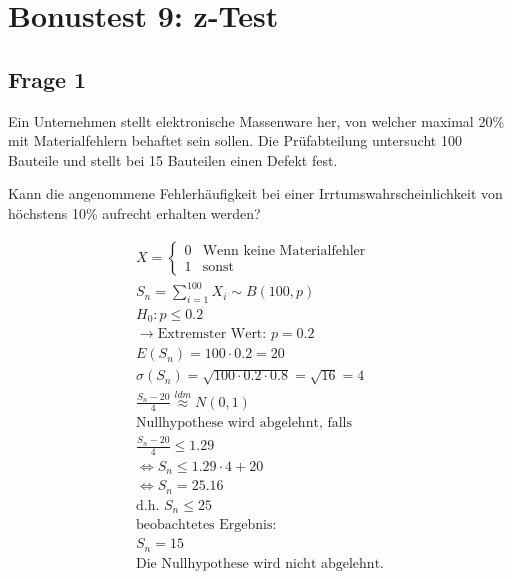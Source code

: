 \chapter{Bonustest 9: z-Test}

\section{Frage 1}
Ein Unternehmen stellt elektronische Massenware her, von welcher maximal 20\%
mit Materialfehlern behaftet sein sollen. Die Prüfabteilung untersucht 100
Bauteile und stellt bei 15 Bauteilen einen Defekt fest.

Kann die angenommene Fehlerhäufigkeit bei einer Irrtumswahrscheinlichkeit von
höchstens 10\% aufrecht erhalten werden?

\begin{align*}
    X = \begin{cases}
            0 & \text{Wenn keine Materialfehler} \\
            1 & \text{sonst}
        \end{cases}                      \\
    S_n = \sum_{i = 1}^{100} X_i \sim B(100, p)                   \\
    H_0: p \leq 0.2                                               \\
    \rightarrow \text{Extremster Wert: } p = 0.2                  \\
    E(S_n) = 100 \cdot 0.2 = 20                                   \\
    \sigma(S_n) = \sqrt{100  \cdot 0.2 \cdot 0.8} = \sqrt{16} = 4 \\
    \frac{S_n - 20}{4} \overset{ldm}{\approx} N(0, 1)             \\
    \text{Nullhypothese wird abgelehnt, falls}                    \\
    \frac{S_n - 20}{4} \leq 1.29                                  \\
    \Leftrightarrow S_n \leq 1.29 \cdot 4 + 20                    \\
    \Leftrightarrow S_n = 25.16                                   \\
    \text{d.h. } S_n \leq 25                                      \\
    \text{beobachtetes Ergebnis:}                                 \\
    S_n = 15                                                      \\
    \text{Die Nullhypothese wird nicht abgelehnt.}
\end{align*}

